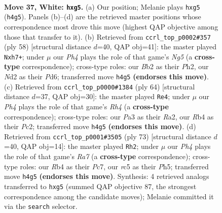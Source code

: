 \documentclass[11pt]{article}
\begin{document}
\clearpage

\begin{figure}[p]\centering
\begin{subfigure}{0.46\textwidth}\centering
\resizebox{\linewidth}{!}{%
\newchessgame
\chessboard[
  setfen={5k2/8/2p5/2r3pp/1R3r1P/P7/1B1N2K1/8 w - - 0 37},
  showmover=false,
  pgfstyle=straightmove, color=movearrow, markmove={h4-g5}
]}
\caption{}
\end{subfigure}\hfill
\begin{subfigure}{0.46\textwidth}\centering
\resizebox{\linewidth}{!}{%
\newchessgame
\chessboard[
  setfen={1n2rk2/7p/3P2p1/6N1/5P2/p3R3/r5PP/6K1 w - - 2 30},
  showmover=false,
  pgfstyle=straightmove, color=movearrow, markmove={g5-h7}
]}
\caption{}
\end{subfigure}
\\[4pt]
\begin{subfigure}{0.46\textwidth}\centering
\resizebox{\linewidth}{!}{%
\newchessgame
\chessboard[
  setfen={8/4pk2/8/5r1p/7R/2r5/R1P1KPP1/8 w - - 1 33},
  showmover=false,
  pgfstyle=straightmove, color=movearrow, markmove={h4-e4}
]}
\caption{}
\end{subfigure}\hfill
\begin{subfigure}{0.46\textwidth}\centering
\resizebox{\linewidth}{!}{%
\newchessgame
\chessboard[
  setfen={8/2p5/4k1p1/P1R4p/2P2P1P/8/r7/5K2 b - - 0 37},
  showmover=false,
  pgfstyle=straightmove, color=movearrow, markmove={a2-h2}
]}
\caption{}
\end{subfigure}
\caption{\textbf{Move 37, White: \texttt{hxg5}.} (a) Our position; Melanie plays \texttt{hxg5} (\texttt{h4g5}). Panels (b)--(d) are the retrieved master positions whose correspondence most drove this move (highest QAP objective among those that transfer to it). (b) Retrieved from \texttt{ccrl\_top\_p0002\#357} (ply 58) [structural distance $d$=40, QAP obj=41]: the master played \texttt{Nxh7+}; under $\mu$ our \emph{Ph4} plays the role of that game's \emph{Ng5} (a \textbf{cross-type} correspondence); cross-type roles: our \emph{B}b2 as their \emph{P}h2, our \emph{N}d2 as their \emph{P}d6; transferred move \texttt{h4g5} \textbf{(endorses this move)}. (c) Retrieved from \texttt{ccrl\_top\_p0000\#1384} (ply 64) [structural distance $d$=37, QAP obj=30]: the master played \texttt{Re4}; under $\mu$ our \emph{Ph4} plays the role of that game's \emph{Rh4} (a \textbf{cross-type} correspondence); cross-type roles: our \emph{P}a3 as their \emph{R}a2, our \emph{R}b4 as their \emph{P}c2; transferred move \texttt{h4g5} \textbf{(endorses this move)}. (d) Retrieved from \texttt{ccrl\_top\_p0001\#3505} (ply 73) [structural distance $d$=40, QAP obj=14]: the master played \texttt{Rh2}; under $\mu$ our \emph{Ph4} plays the role of that game's \emph{Ra7} (a \textbf{cross-type} correspondence); cross-type roles: our \emph{R}b4 as their \emph{P}c7, our \emph{r}c5 as their \emph{P}h5; transferred move \texttt{h4g5} \textbf{(endorses this move)}. Synthesis: 4 retrieved analogs transferred to \texttt{hxg5} (summed QAP objective 87, the strongest correspondence among the candidate moves); Melanie committed it via the \texttt{search} selector.}
\label{fig:thought-m72}
\end{figure}
\end{document}

